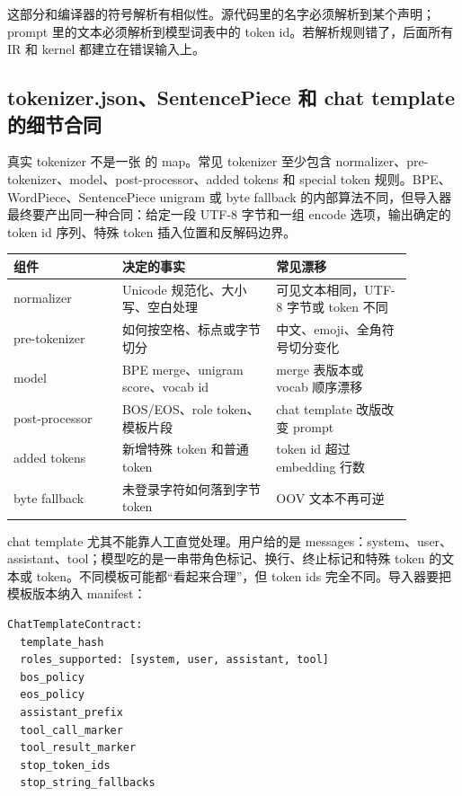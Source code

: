 这部分和编译器的符号解析有相似性。源代码里的名字必须解析到某个声明；prompt 里的文本必须解析到模型词表中的 token id。若解析规则错了，后面所有 IR 和 kernel 都建立在错误输入上。

\subsection{tokenizer.json、SentencePiece 和 chat template 的细节合同}

真实 tokenizer 不是一张  的 map。常见 tokenizer 至少包含 normalizer、pre-tokenizer、model、post-processor、added tokens 和 special token 规则。BPE、WordPiece、SentencePiece unigram 或 byte fallback 的内部算法不同，但导入器最终要产出同一种合同：给定一段 UTF-8 字节和一组 encode 选项，输出确定的 token id 序列、特殊 token 插入位置和反解码边界。

\begin{center}
\small
\begin{tabular}{p{0.24\linewidth}p{0.34\linewidth}p{0.30\linewidth}}
\toprule
组件 & 决定的事实 & 常见漂移 \\
\midrule
normalizer & Unicode 规范化、大小写、空白处理 & 可见文本相同，UTF-8 字节或 token 不同 \\
pre-tokenizer & 如何按空格、标点或字节切分 & 中文、emoji、全角符号切分变化 \\
model & BPE merge、unigram score、vocab id & merge 表版本或 vocab 顺序漂移 \\
post-processor & BOS/EOS、role token、模板片段 & chat template 改版改变 prompt \\
added tokens & 新增特殊 token 和普通 token & token id 超过 embedding 行数 \\
byte fallback & 未登录字符如何落到字节 token & OOV 文本不再可逆 \\
\bottomrule
\end{tabular}
\end{center}

chat template 尤其不能靠人工直觉处理。用户给的是 messages：system、user、assistant、tool；模型吃的是一串带角色标记、换行、终止标记和特殊 token 的文本或 token。不同模板可能都“看起来合理”，但 token ids 完全不同。导入器要把模板版本纳入 manifest：

\begin{lstlisting}[numbers=none,caption={chat template 合同字段}]
ChatTemplateContract:
  template_hash
  roles_supported: [system, user, assistant, tool]
  bos_policy
  eos_policy
  assistant_prefix
  tool_call_marker
  tool_result_marker
  stop_token_ids
  stop_string_fallbacks
\end{lstlisting}

